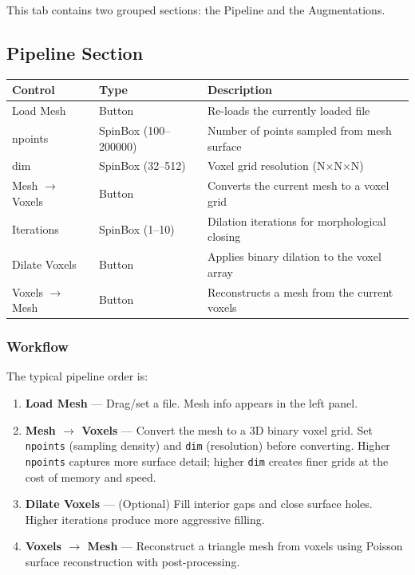 \documentclass[12pt,a4paper]{article}
\begin{document}
This tab contains two grouped sections: the Pipeline and the Augmentations.

\subsection{Pipeline Section}

\begin{table}[H]
\centering
\begin{tabular}{llp{8cm}}
\toprule
\textbf{Control} & \textbf{Type} & \textbf{Description} \\
\midrule
Load Mesh & Button & Re-loads the currently loaded file \\
npoints & SpinBox (100--200000) & Number of points sampled from mesh surface \\
dim & SpinBox (32--512) & Voxel grid resolution (N$\times$N$\times$N) \\
Mesh $\rightarrow$ Voxels & Button & Converts the current mesh to a voxel grid \\
Iterations & SpinBox (1--10) & Dilation iterations for morphological closing \\
Dilate Voxels & Button & Applies binary dilation to the voxel array \\
Voxels $\rightarrow$ Mesh & Button & Reconstructs a mesh from the current voxels \\
\bottomrule
\end{tabular}
\end{table}

\subsubsection{Workflow}
The typical pipeline order is:
\begin{enumerate}
  \item \textbf{Load Mesh} --- Drag/set a file. Mesh info appears in the left panel.
  \item \textbf{Mesh $\rightarrow$ Voxels} --- Convert the mesh to a 3D binary voxel grid. Set \texttt{npoints} (sampling density) and \texttt{dim} (resolution) before converting. Higher \texttt{npoints} captures more surface detail; higher \texttt{dim} creates finer grids at the cost of memory and speed.
  \item \textbf{Dilate Voxels} --- (Optional) Fill interior gaps and close surface holes. Higher iterations produce more aggressive filling.
  \item \textbf{Voxels $\rightarrow$ Mesh} --- Reconstruct a triangle mesh from voxels using Poisson surface reconstruction with post-processing.
\end{enumerate}
\end{document}
